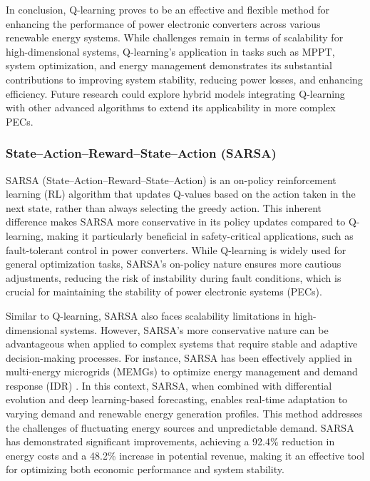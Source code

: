 In conclusion, Q-learning proves to be an effective and flexible method for enhancing the performance of power electronic converters across various renewable energy systems. While challenges remain in terms of scalability for high-dimensional systems, Q-learning's application in tasks such as MPPT, system optimization, and energy management demonstrates its substantial contributions to improving system stability, reducing power losses, and enhancing efficiency. Future research could explore hybrid models integrating Q-learning with other advanced algorithms to extend its applicability in more complex PECs.

\subsubsection{State–Action–Reward–State–Action (SARSA)}

SARSA (State–Action–Reward–State–Action) is an on-policy reinforcement learning (RL) algorithm that updates Q-values based on the action taken in the next state, rather than always selecting the greedy action. This inherent difference makes SARSA more conservative in its policy updates compared to Q-learning, making it particularly beneficial in safety-critical applications, such as fault-tolerant control in power converters. While Q-learning is widely used for general optimization tasks, SARSA’s on-policy nature ensures more cautious adjustments, reducing the risk of instability during fault conditions, which is crucial for maintaining the stability of power electronic systems (PECs).

Similar to Q-learning, SARSA also faces scalability limitations in high-dimensional systems. However, SARSA's more conservative nature can be advantageous when applied to complex systems that require stable and adaptive decision-making processes. For instance, SARSA has been effectively applied in multi-energy microgrids (MEMGs) to optimize energy management and demand response (IDR) \cite{mughees2025optimizing}. In this context, SARSA, when combined with differential evolution and deep learning-based forecasting, enables real-time adaptation to varying demand and renewable energy generation profiles. This method addresses the challenges of fluctuating energy sources and unpredictable demand. SARSA has demonstrated significant improvements, achieving a 92.4\% reduction in energy costs and a 48.2\% increase in potential revenue, making it an effective tool for optimizing both economic performance and system stability.

